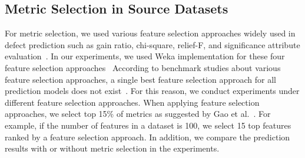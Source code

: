 % 

\subsection{Metric Selection in Source Datasets}\label{sect:fss}
\label{sec:metricselection}
For metric selection, we used various feature selection
approaches widely used in defect prediction such as gain ratio, chi-square,
relief-F, and significance attribute evaluation~\cite{Gao11,Shivaji13}. In our experiments, we used Weka implementation for these four feature selection approaches~\cite{Weka}
According to benchmark studies about various feature selection approaches, a
single best feature selection approach for all prediction models does not
exist~\cite{Catal09,Hall03,Liu02}. For this reason, we conduct experiments
under different feature selection approaches. When applying feature selection
approaches, we select top 15\% of metrics as suggested by Gao et
al.~\cite{Gao11}. For example, if the number of features in a dataset is 100, we select 15 top features ranked by a feature selection approach. In addition, we compare the prediction results with or without
metric selection in the experiments.





